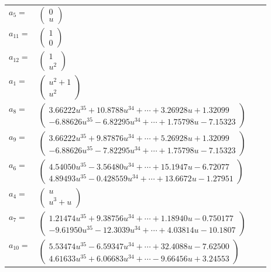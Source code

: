 \documentclass[1p]{elsarticle_modified}
\theoremstyle{definition}
\begin{document}
\begin{tabular}{m{7pt} m{180pt} m{7pt} m{180pt} }
\flushright $a_{5}=$&$\begin{pmatrix}0\\u\end{pmatrix}$ \\
\flushright $a_{11}=$&$\begin{pmatrix}1\\0\end{pmatrix}$ \\
\flushright $a_{12}=$&$\begin{pmatrix}1\\u^2\end{pmatrix}$ \\
\flushright $a_{1}=$&$\begin{pmatrix}u^2+1\\u^2\end{pmatrix}$ \\
\flushright $a_{8}=$&$\begin{pmatrix}3.66222 u^{35}+10.8788 u^{34}+\cdots+3.26928 u+1.32099\\-6.88626 u^{35}-6.82295 u^{34}+\cdots+1.75798 u-7.15323\end{pmatrix}$ \\
\flushright $a_{9}=$&$\begin{pmatrix}3.66222 u^{35}+9.87876 u^{34}+\cdots+5.26928 u+1.32099\\-6.88626 u^{35}-7.82295 u^{34}+\cdots+1.75798 u-7.15323\end{pmatrix}$ \\
\flushright $a_{6}=$&$\begin{pmatrix}4.54050 u^{35}-3.56480 u^{34}+\cdots+15.1947 u-6.72077\\4.89493 u^{35}-0.428559 u^{34}+\cdots+13.6672 u-1.27951\end{pmatrix}$ \\
\flushright $a_{4}=$&$\begin{pmatrix}u\\u^3+u\end{pmatrix}$ \\
\flushright $a_{7}=$&$\begin{pmatrix}1.21474 u^{35}+9.38756 u^{34}+\cdots+1.18940 u-0.750177\\-9.61950 u^{35}-12.3039 u^{34}+\cdots+4.03814 u-10.1807\end{pmatrix}$ \\
\flushright $a_{10}=$&$\begin{pmatrix}5.53474 u^{35}-6.59347 u^{34}+\cdots+32.4088 u-7.62500\\4.61633 u^{35}+6.06683 u^{34}+\cdots-9.66456 u+3.24553\end{pmatrix}$ \\

\end{tabular}
\end{document}
